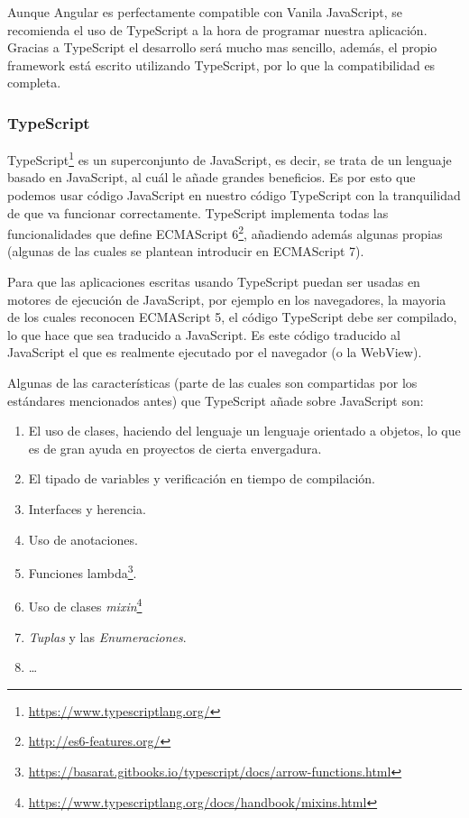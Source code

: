 Aunque Angular es perfectamente compatible con Vanila JavaScript, se recomienda el uso de TypeScript a la hora de programar nuestra aplicación. Gracias a TypeScript el desarrollo será mucho mas sencillo, además, el propio framework está escrito utilizando TypeScript, por lo que la compatibilidad es completa.

\subsubsection{TypeScript}

TypeScript\footnote{\url{https://www.typescriptlang.org/}} es un superconjunto de JavaScript, es decir, se trata de un lenguaje basado en JavaScript, al cuál le añade grandes beneficios. Es por esto que podemos usar código JavaScript en nuestro código TypeScript con la tranquilidad de que va funcionar correctamente. TypeScript implementa todas las funcionalidades que define ECMAScript 6\footnote{\url{http://es6-features.org/}}, añadiendo además algunas propias (algunas de las cuales se plantean introducir en ECMAScript 7).

Para que las aplicaciones escritas usando TypeScript puedan ser usadas en motores de ejecución de JavaScript, por ejemplo en los navegadores, la mayoria de los cuales reconocen ECMAScript 5, el código TypeScript debe ser compilado, lo que hace que sea traducido a JavaScript. Es este código traducido al JavaScript el que es realmente ejecutado por el navegador (o la WebView).

Algunas de las características (parte de las cuales son compartidas por los estándares mencionados antes) que TypeScript añade sobre JavaScript son:

\begin{enumerate}
  \item El uso de clases, haciendo del lenguaje un lenguaje orientado a objetos, lo que es de gran ayuda en proyectos de cierta envergadura.
  \item El tipado de variables y verificación en tiempo de compilación.
  \item Interfaces y herencia.
  \item Uso de anotaciones.
  \item Funciones lambda\footnote{\url{https://basarat.gitbooks.io/typescript/docs/arrow-functions.html}}.
  \item Uso de clases \emph{mixin}\footnote{\url{https://www.typescriptlang.org/docs/handbook/mixins.html}}
  \item \emph{Tuplas} y las \emph{Enumeraciones}.
  \item \ldots
\end{enumerate}

